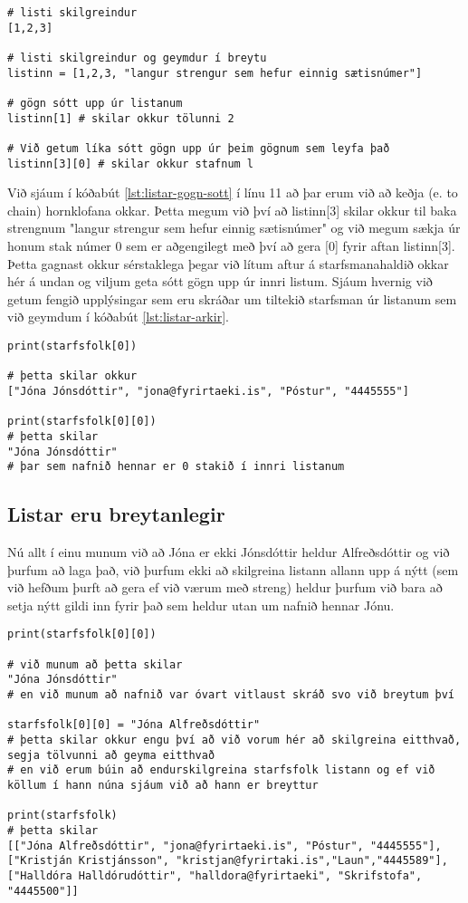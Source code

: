 \begin{lstlisting}[caption=Listar af listum, label=lst:listar-gogn-sott]
# listi skilgreindur
[1,2,3]

# listi skilgreindur og geymdur í breytu
listinn = [1,2,3, "langur strengur sem hefur einnig sætisnúmer"]

# gögn sótt upp úr listanum
listinn[1] # skilar okkur tölunni 2

# Við getum líka sótt gögn upp úr þeim gögnum sem leyfa það
listinn[3][0] # skilar okkur stafnum l
\end{lstlisting}

Við sjáum í kóðabút \ref{lst:listar-gogn-sott} í línu 11 að þar erum við að keðja (e. to chain) hornklofana okkar.
Þetta megum við því að listinn[3] skilar okkur til baka strengnum "langur strengur sem hefur einnig sætisnúmer" og við megum sækja úr honum stak númer 0 sem er aðgengilegt með því að gera [0] fyrir aftan listinn[3].
Þetta gagnast okkur sérstaklega þegar við lítum aftur á starfsmanahaldið okkar hér á undan og viljum geta sótt gögn upp úr innri listum.
Sjáum hvernig við getum fengið upplýsingar sem eru skráðar um tiltekið starfsman úr listanum sem við geymdum í kóðabút \ref{lst:listar-arkir}.

\begin{lstlisting}[caption=Unnið með gögn úr lista, label=lst:listar-gagnanotkun]
print(starfsfolk[0])

# þetta skilar okkur 
["Jóna Jónsdóttir", "jona@fyrirtaeki.is", "Póstur", "4445555"]

print(starfsfolk[0][0])
# þetta skilar
"Jóna Jónsdóttir"
# þar sem nafnið hennar er 0 stakið í innri listanum
\end{lstlisting}

\subsection{Listar eru breytanlegir}
Nú allt í einu munum við að Jóna er ekki Jónsdóttir heldur Alfreðsdóttir og við þurfum að laga það, við þurfum ekki að skilgreina listann allann upp á nýtt (sem við hefðum þurft að gera ef við værum með streng) heldur þurfum við bara að setja nýtt gildi inn fyrir það sem heldur utan um nafnið hennar Jónu.

\begin{lstlisting}[caption=Unnið með gögn úr lista, label=lst:listar-gagnabreyting]
print(starfsfolk[0][0])

# við munum að þetta skilar 
"Jóna Jónsdóttir"
# en við munum að nafnið var óvart vitlaust skráð svo við breytum því

starfsfolk[0][0] = "Jóna Alfreðsdóttir"
# þetta skilar okkur engu því að við vorum hér að skilgreina eitthvað, segja tölvunni að geyma eitthvað
# en við erum búin að endurskilgreina starfsfolk listann og ef við köllum í hann núna sjáum við að hann er breyttur

print(starfsfolk) 
# þetta skilar 
[["Jóna Alfreðsdóttir", "jona@fyrirtaeki.is", "Póstur", "4445555"], ["Kristján Kristjánsson", "kristjan@fyrirtaki.is","Laun","4445589"], ["Halldóra Halldórudóttir", "halldora@fyrirtaeki", "Skrifstofa", "4445500"]]
\end{lstlisting}

